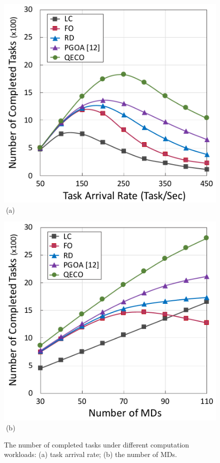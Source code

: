 \documentclass[12pt,draftclsnofoot,onecolumn]{IEEEtran}
\begin{document}
\begin{figure}[tbp]
	\centering
	\captionsetup{name=Fig.}
	\begin{minipage}[b]{0.34\linewidth}
		\centering
		\includegraphics[width=\textwidth]{Fig/completed_tasks_1} 
		\textcolor{white}{i}\hspace{0.6cm}(a)
	\end{minipage}
	\hspace{-0.2cm}
	\begin{minipage}[b]{0.34\linewidth}
		\centering
		\includegraphics[width=\textwidth]{Fig/completed_tasks_2}
		\textcolor{white}{i}\hspace{0.6cm}(b)
	\end{minipage}
	\caption{The number of completed tasks under different computation workloads: (a) task arrival rate; (b) the number of MDs.}
	\label{chart1}
\end{figure}
\end{document}
